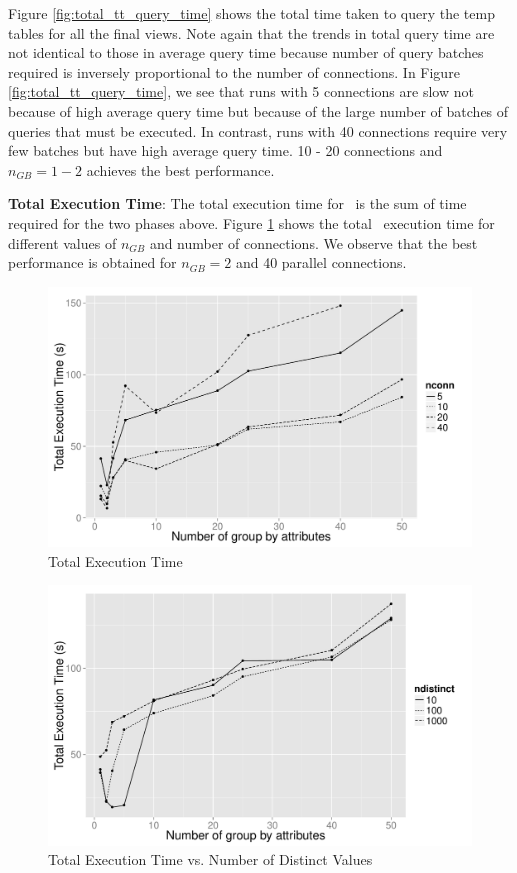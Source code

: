 Figure \ref{fig:total_tt_query_time} shows the total time taken to query the
temp tables for all the final views. Note again that the trends in total query
time are not identical to those in average query time because number of query
batches required is inversely proportional to the number of connections.
In Figure \ref{fig:total_tt_query_time}, we see that runs with 5 connections are
slow not because of high average query time but because of the large number of
batches of queries that must be executed. In contrast, runs with 40 connections
require very few batches but have high average query time. 10 - 20 connections
and $n_{GB}=1-2$ achieves the best performance.



{\bf Total Execution Time}: The total execution time for \SeeDB\ is the sum of
time required for the two phases above. Figure \ref{fig:total_time} shows the
total \SeeDB\ execution time for different values of $n_{GB}$ and number of
connections. We observe that the best performance is obtained for
$n_{GB}=2$ and 40 parallel connections.

\begin{figure}[h]
     \centering
    \includegraphics[width=12cm]{Images/mult_gb_total.pdf}
    \caption{Total Execution Time}
  \label{fig:total_time}
\end{figure}

\begin{figure}[h]
  \centering
    \includegraphics[width=12cm]{Images/mult_gb_diff_distinct.pdf}
    \caption{Total Execution Time vs. Number of Distinct Values} 
  \label{fig:total_time_diff_distinct}

\end{figure}

